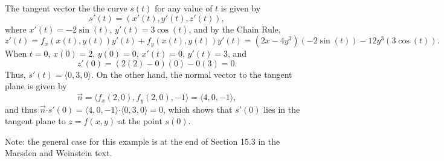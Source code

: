 \documentclass[letterpaper,12pt]{article}
\begin{document}
\begin{enumerate}
\begin{enumerate}
The tangent vector the the curve $s(t)$ for any value of $t$ is given by
\[
 s'(t) = (x'(t), y'(t), z'(t)),
\]
where $x'(t) = -2\sin (t)$, $y'(t) = 3\cos(t)$, and by the Chain Rule,
\[
 z'(t) = f_x(x(t),y(t))y'(t)+f_y(x(t),y(t))y'(t) = (2x-4y^3)(-2\sin(t))-12y^3(3\cos(t)).
\]
When $t=0$, $x(0)=2$, $y(0)=0$, $x'(t)=0$, $y'(t)=3$, and
\[
 z'(0) = (2(2)-0)(0)-0(3)=0.
\]
Thus, $s'(t) = \langle 0,3,0\rangle$. On the other hand, the normal vector to the tangent plane is given by
\[
 \vec{n} = \langle f_x(2,0), f_y(2,0), -1\rangle = \langle 4, 0 , -1\rangle,
\]
and thus $\vec{n}\boldsymbol{\cdot}s'(0) = \langle 4, 0, -1\rangle\boldsymbol{\cdot}\langle 0,3,0\rangle = 0$, which shows that $s'(0)$ lies in the tangent plane to $z=f(x,y)$ at the point $s(0)$.
\end{enumerate}
Note: the general case for this example is at the end of Section 15.3 in the Marsden and Weinstein text.


\end{enumerate}
\end{document}
